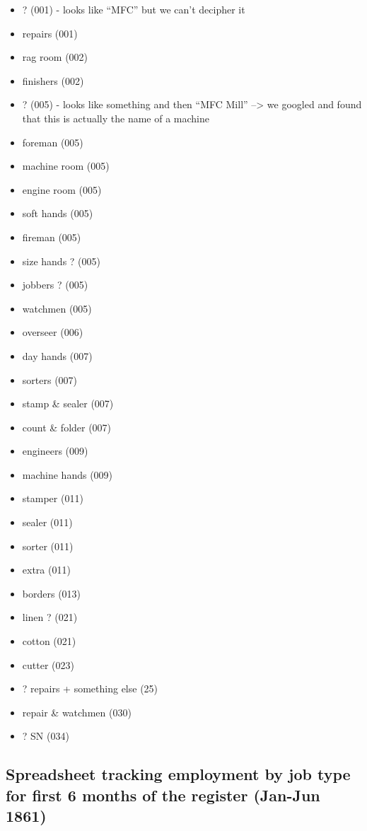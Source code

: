 \documentclass[
  letterpaper,
  DIV=11,
  numbers=noendperiod]{scrartcl}
\begin{document}
\begin{itemize}
\item
  ? (001) - looks like ``MFC'' but we can't decipher it
\item
  repairs (001)
\item
  rag room (002)
\item
  finishers (002)
\item
  ? (005) - looks like something and then ``MFC Mill'' --\textgreater{}
  we googled and found that this is actually the name of a machine
\item
  foreman (005)
\item
  machine room (005)
\item
  engine room (005)
\item
  soft hands (005)
\item
  fireman (005)
\item
  size hands ? (005)
\item
  jobbers ? (005)
\item
  watchmen (005)
\item
  overseer (006)
\item
  day hands (007)
\item
  sorters (007)
\item
  stamp \& sealer (007)
\item
  count \& folder (007)
\item
  engineers (009)
\item
  machine hands (009)
\item
  stamper (011)
\item
  sealer (011)
\item
  sorter (011)
\item
  extra (011)
\item
  borders (013)
\item
  linen ? (021)
\item
  cotton (021)
\item
  cutter (023)
\item
  ? repairs + something else (25)
\item
  repair \& watchmen (030)
\item
  ? SN (034)
\end{itemize}

\hypertarget{spreadsheet-tracking-employment-by-job-type-for-first-6-months-of-the-register-jan-jun-1861}{%
\subsection{Spreadsheet tracking employment by job type for first 6
months of the register (Jan-Jun
1861)}\label{spreadsheet-tracking-employment-by-job-type-for-first-6-months-of-the-register-jan-jun-1861}}
\end{document}
